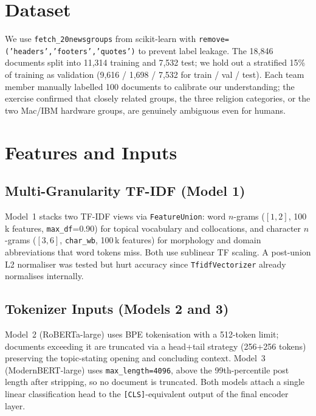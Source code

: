 \documentclass[11pt]{article}
\begin{document}
\section{Dataset}

We use \texttt{fetch\_20newsgroups} from scikit-learn with
\texttt{remove=('headers','footers','quotes')} to prevent label leakage.
The 18,846 documents split into 11,314 training and 7,532 test; we hold
out a stratified 15\% of training as validation (9,616 / 1,698 / 7,532
for train / val / test).  Each team member manually labelled 100
documents to calibrate our understanding; the exercise confirmed that
closely related groups, the three religion categories, or the two
Mac/IBM hardware groups, are genuinely ambiguous even for humans.

\section{Features and Inputs}

\subsection{Multi-Granularity TF-IDF (Model 1)}

Model~1 stacks two TF-IDF views via \texttt{FeatureUnion}: word
$n$-grams ($[1,2]$, 100\,k features, \texttt{max\_df}=0.90) for topical
vocabulary and collocations, and character $n$-grams ($[3,6]$,
\texttt{char\_wb}, 100\,k features) for morphology and domain
abbreviations that word tokens miss.  Both use sublinear TF scaling.
A post-union L2 normaliser was tested but hurt accuracy since
\texttt{TfidfVectorizer} already normalises internally.

\subsection{Tokenizer Inputs (Models 2 and 3)}

Model~2 (RoBERTa-large) uses BPE tokenisation with a 512-token limit;
documents exceeding it are truncated via a head+tail strategy (256+256
tokens) preserving the topic-stating opening and concluding context.
Model~3 (ModernBERT-large) uses \texttt{max\_length=4096}, above the
99th-percentile post length after stripping, so no document is
truncated.  Both models attach a single linear classification head to
the \texttt{[CLS]}-equivalent output of the final encoder layer.
\end{document}
